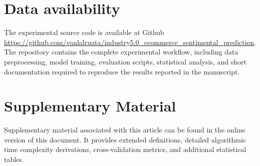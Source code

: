 \documentclass[authoryear,review,3p,times,12pt]{elsarticle}
\begin{document}
\section*{Data availability}
The experimental source code is available at Github\\ \href{https://github.com/vanlalruata/industry5.0_ecommerce_sentimental_prediction}{https://github.com/vanlalruata/industry5.0\_ecommerce\_sentimental\_prediction}. The repository contains the complete experimental workflow, including data preprocessing, model training, evaluation scripts, statistical analysis, and short documentation required to reproduce the results reported in the manuscript.




\section*{Supplementary Material}
Supplementary material associated with this article can be found in the online version of this document. It provides extended definitions, detailed algorithmic time complexity derivations, cross-validation metrics, and additional statistical tables.

\newpage
\end{document}
